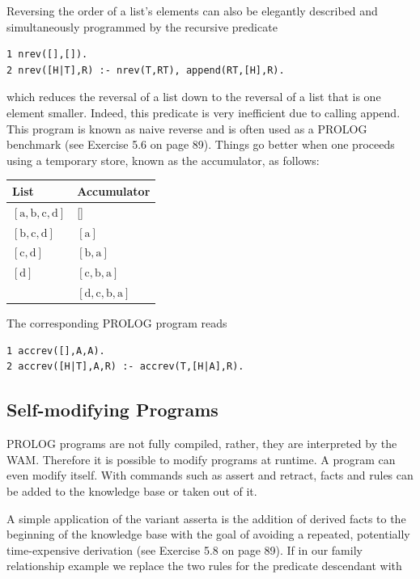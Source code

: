 \documentclass[10pt]{book}
\begin{document}
Reversing the order of a list's elements can also be elegantly described and simultaneously programmed by the recursive predicate

\begin{verbatim}
1 nrev([],[]).
2 nrev([H|T],R) :- nrev(T,RT), append(RT,[H],R).
\end{verbatim}

which reduces the reversal of a list down to the reversal of a list that is one element smaller. Indeed, this predicate is very inefficient due to calling append. This program is known as naive reverse and is often used as a PROLOG benchmark (see Exercise 5.6 on page 89). Things go better when one proceeds using a temporary store, known as the accumulator, as follows:

\begin{center}
\begin{tabular}{ll}
\hline
List & Accumulator \\
\hline
$[\mathrm{a}, \mathrm{b}, \mathrm{c}, \mathrm{d}]$ & [] \\
\hline
$[\mathrm{b}, \mathrm{c}, \mathrm{d}]$ & $[\mathrm{a}]$ \\
\hline
$[\mathrm{c}, \mathrm{d}]$ & $[\mathrm{b}, \mathrm{a}]$ \\
\hline
$[\mathrm{d}]$ & $[\mathrm{c}, \mathrm{b}, \mathrm{a}]$ \\
\hline
[] & $[\mathrm{d}, \mathrm{c}, \mathrm{b}, \mathrm{a}]$ \\
\hline
\end{tabular}
\end{center}

The corresponding PROLOG program reads

\begin{verbatim}
1 accrev([],A,A).
2 accrev([H|T],A,R) :- accrev(T,[H|A],R).
\end{verbatim}

\subsection{Self-modifying Programs}
PROLOG programs are not fully compiled, rather, they are interpreted by the WAM. Therefore it is possible to modify programs at runtime. A program can even modify itself. With commands such as assert and retract, facts and rules can be added to the knowledge base or taken out of it.

A simple application of the variant asserta is the addition of derived facts to the beginning of the knowledge base with the goal of avoiding a repeated, potentially time-expensive derivation (see Exercise 5.8 on page 89). If in our family relationship example we replace the two rules for the predicate descendant with
\end{document}

